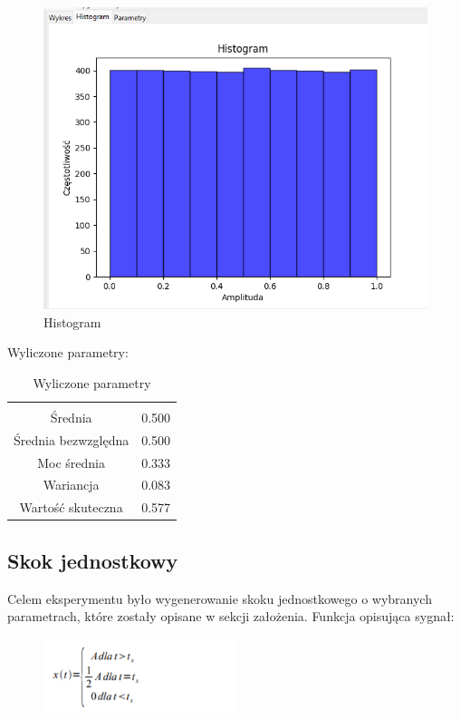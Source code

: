\documentclass{article}
\begin{document}
\begin{figure}[h!]
    \centering
    \includegraphics[width=\textwidth]{img/trojkat/hist.png}
    \caption{Histogram}
\end{figure}
\FloatBarrier
Wyliczone parametry:
\begin{table}[h!]
    \centering
    \vspace{0.2cm}
    \begin{tabular}{|c|c|}
        \hline\hline\\[-0.4cm]
        Średnia & 0.500  \\
        \hline
        Średnia bezwzględna & 0.500  \\
        \hline
        Moc średnia & 0.333  \\
        \hline
        Wariancja & 0.083 \\
        \hline
        Wartość skuteczna & 0.577 \\
        \hline
    \end{tabular}
    \caption{Wyliczone parametry}
    \label{trojkat}
\end{table}     

\subsection{Skok jednostkowy} \label{skokjednostowy} 
Celem eksperymentu było wygenerowanie skoku jednostkowego o wybranych parametrach,
                które zostały opisane w sekcji założenia. Funkcja opisująca sygnał:

        \begin{figure}[!htbp]
            \centering
            \includegraphics[width=0.5\textwidth]{img/skokjednostowy.png}
        \end{figure}
\end{document}
